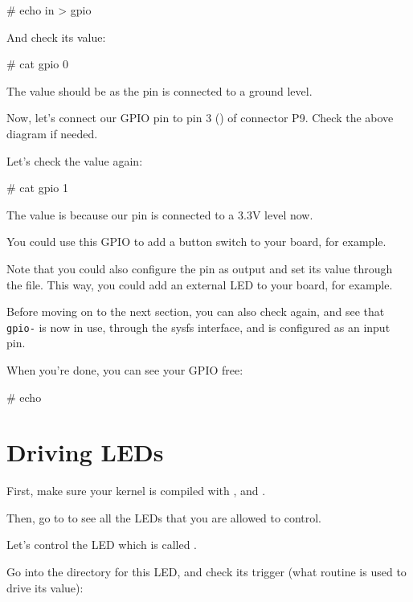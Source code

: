 \begin{bashinput}
# echo in > gpio%
\end{bashinput}

And check its value:

\begin{bashinput}
# cat gpio%
0
\end{bashinput}

The value should be  as the pin is connected to a ground level.

{Now, let's connect our GPIO pin to pin 3 () of connector P9. Check the above diagram if needed.

Let's check the value again:

\begin{bashinput}
# cat gpio%
1
\end{bashinput}

The value is  because our pin is connected to a 3.3V level now.

You could use this GPIO to add a button switch to your board, for
example.

Note that you could also configure the pin as output and set its value
through the  file. This way, you could add an external LED
to your board, for example.

Before moving on to the next section, you can also check
 again, and see that {\tt gpio-\gpionum} is now
in use, through the sysfs interface, and is configured as an input pin.

When you're done, you can see your GPIO free:

\begin{bashinput}
# echo %
\end{bashinput}

\section{Driving LEDs}

First, make sure your kernel is compiled with
, 
and .

Then, go to  to see all the LEDs that you are allowed
to control.

Let's control the LED which is called
.

Go into the directory for this LED, and check its trigger (what
routine is used to drive its value):

}
